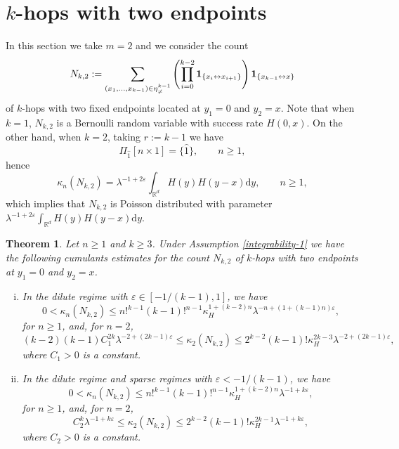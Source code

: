 \documentclass[12pt]{article}
\newcommand{\R}{\mathbb{R}}
\newcommand{\bone}{{\bf 1}}
\newtheorem{thm}[prop]{Theorem}
\numberwithin{equation}{section}
\begin{document}
\section{$k$-hops with two endpoints}
\noindent 
In this section we take $m=2$ and we consider the count
\begin{equation}
\nonumber
N_{k,2}:=\sum_{(x_1, \ldots , x_{k-1})\in\eta_{\ne}^{k-1}}
\left(\prod_{i=0}^{k-2}\bone_{\{x_i\leftrightarrow x_{i+1}\}}\right)\bone_{\{x_{k-1}\leftrightarrow x\}}
\end{equation}
of $k$-hops with two fixed endpoints located at $y_1=0$ and $y_2=x$. 
Note that when $k=1$, $N_{k,2}$ is a Bernoulli random variable with success rate $H(0,x)$.
On the other hand, when $k=2$,
taking $r:=k-1$ we have
$$\Pi_{\widehat{1}}[n\times 1]=\{\widehat{1}\},
\qquad n\geq 1,
$$
 hence 
\begin{equation}
\nonumber
  \kappa_n(N_{k,2})=\lambda^{-1+2\varepsilon }\int_{\R^d}H(y)H(y-x)\mathrm{d}y,
 \qquad 
 n\geq 1,
\end{equation}
which implies that $N_{k,2}$ is Poisson distributed
 with parameter $\lambda^{-1+2\varepsilon }\int_{\R^d}H(y)H(y-x)\mathrm{d}y$.
\begin{thm}\label{khoptwo}
  Let $n\geq 1$ and $k\geq 3$. 
  Under Assumption \eqref{integrability-1} we have the following
  cumulants estimates for the count $N_{k,2}$ of $k$-hops with two 
  endpoints at $y_1=0$ and $y_2=x$. 
\begin{enumerate}[i)]
\item In the dilute regime with 
  $\varepsilon \in [ -1/(k-1) , 1]$, we have
\begin{equation}
\nonumber
0<\kappa_n(N_{k,2})\leq n!^{k-1} (k-1)!^{n-1}\kappa_H^{1+(k-2)n} \lambda^{-n + (1+(k-1)n)\varepsilon },
\end{equation}
for $n\geq 1$,
and, for $n=2$, 
\begin{equation}
\nonumber
(k-2)(k-1)C_1^{2k} \lambda^{-2 + (2k-1)\varepsilon }
\leq \kappa_2(N_{k,2})
\leq 2^{k-2}(k-1)!\kappa_H^{2k-3} \lambda^{-2 + (2k-1)\varepsilon },
\end{equation}
where $C_1 > 0$ is a constant.
\item In the dilute regime and sparse regimes with 
 $ \varepsilon < -1/(k-1)$, we have 
\begin{equation}
\nonumber
0<\kappa_n(N_{k,2})\leq n!^{k-1} (k-1)!^{n-1}\kappa_H^{1+(k-2)n} \lambda^{-1 + k \varepsilon },
\end{equation}
for $n\geq 1$, and, for $n=2$,  
\begin{equation}
\nonumber
C_2^k \lambda^{ -1 + k \varepsilon } \leq \kappa_2(N_{k,2})
\leq 2^{k-2} (k-1)!\kappa_H^{2k-1} \lambda^{ -1 + k \varepsilon },
\end{equation}
where $C_2 > 0$ is a constant.
\end{enumerate}
\end{thm}
\end{document}

